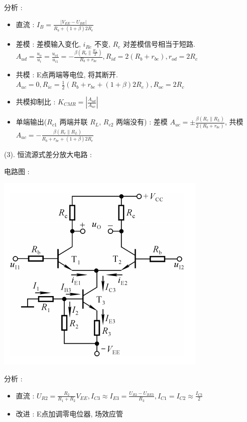 \documentclass[UTF8, 12pt]{ctexart}
\begin{document}
	分析 :
	\begin{itemize}[leftmargin = 4em]
		\item 直流 : $ I_{B} = \frac{|V_{EE}-U_{BE}|}{R_{b}+(1+\beta)2R_{e}} $
		\item 差模 : 差模输入变化, $ i_{Re} $ 不变, $ R_{e} $ 对差模信号相当于短路. $ A_{ud} = \frac{u_{o}}{u_{i}} = \frac{u_{o1}}{u_{i1}} = -\frac{\beta(R_{c} \parallel \frac{R_{L}}{2})}{R_{b}+r_{be}}, R_{id} = 2(R_{b}+r_{be}), r_{od} = 2R_{c} $
		\item 共模 : E点两端等电位, 将其断开. $ A_{uc} = 0, R_{ic} = \frac{1}{2}(R_{b}+r_{be}+(1+\beta)2R_{e}), R_{oc} = 2R_{c} $
		\item 共模抑制比 : $ K_{CMR} = |\frac{A_{ud}}{A_{uc}}| $
		\item 单端输出($ R_{c1} $ 两端并联 $ R_{L} $, $ R_{c2} $ 两端没有) : 差模 $ A_{uc} = \pm \frac{\beta(R_{c} \parallel R_{L})}{2(R_{b}+r_{be})} $, 共模 $ A_{uc} = -\frac{\beta(R_{c} \parallel R_{L})}{R_{b}+r_{be}+(1+\beta)2R_{e}} $ 
	\end{itemize}

	(3). 恒流源式差分放大电路 :

	电路图 :

	\includegraphics[]{03/恒流源式差分放大电路电路图.png}

	分析 :
	\begin{itemize}[leftmargin = 4em]
		\item 直流 : $ U_{R2} = \frac{R_{2}}{R_{1}+R_{2}}V_{EE}, I_{C3} \approx I_{E3} = \frac{U_{R2}-U_{BE3}}{R_{3}}, I_{C1} = I_{C2} \approx \frac{I_{C3}}{2} $
		\item 改进 : E点加调零电位器, 场效应管
	\end{itemize}
\end{document}
